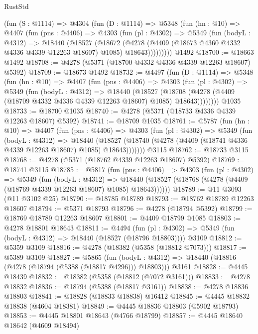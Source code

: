 \begin{lexlean}{RustStd}
\begin{coremodule}
    (fun (S : @1114) =>
    @4304
      (fun (D : @1114) =>
      @5348
        (fun (hn : @10) =>
        @4407
          (fun (pns : @4406) =>
          @4303
            (fun (pl : @4302) =>
            @5349
              (fun (bodyL : @4312) =>
              @18440
                (@18527
                  (@18672
                    (@4278
                      (@4409 (@18673 @4360 @4332 @4336 @4339 @12263 @18607) @1085)
                      @18643)))))))))
    @1492
@18700 := @18663 @1492
@18708 := @4278 (@5371 (@18700 @4332 @4336 @4339 @12263 @18607) @5392)
@18709 := @18673 @1492
@18732 := @4497
    (fun (D : @1114) =>
    @5348
      (fun (hn : @10) =>
      @4407
        (fun (pns : @4406) =>
        @4303
          (fun (pl : @4302) =>
          @5349
            (fun (bodyL : @4312) =>
            @18440
              (@18527
                (@18708 (@4278 (@4409 (@18709 @4332 @4336 @4339 @12263 @18607) @1085) @18643))))))))
    @1035
@18733 := @18700 @1035
@18740 := @4278 (@5371 (@18733 @4336 @4339 @12263 @18607) @5392)
@18741 := @18709 @1035
@18761 := @5787
    (fun (hn : @10) =>
    @4407
      (fun (pns : @4406) =>
      @4303
        (fun (pl : @4302) =>
        @5349
          (fun (bodyL : @4312) =>
          @18440
            (@18527 (@18740 (@4278 (@4409 (@18741 @4336 @4339 @12263 @18607) @1085) @18643)))))))
    @3115
@18762 := @18733 @3115
@18768 := @4278 (@5371 (@18762 @4339 @12263 @18607) @5392)
@18769 := @18741 @3115
@18785 := @5817
    (fun (pns : @4406) =>
    @4303
      (fun (pl : @4302) =>
      @5349
        (fun (bodyL : @4312) =>
        @18440 (@18527 (@18768 (@4278 (@4409 (@18769 @4339 @12263 @18607) @1085) @18643))))))
@18789 := @11 @3093 (@11 @3102 @25)
@18790 := @18785 @18789
@18793 := @18762 @18789 @12263 @18607
@18794 := @5371 @18793
@18796 := @4278 (@18794 @5392)
@18799 := @18769 @18789 @12263 @18607
@18801 := @4409 @18799 @1085
@18803 := @4278 @18801 @18643
@18811 := @4494
    (fun (pl : @4302) => @5349 (fun (bodyL : @4312) => @18440 (@18527 (@18796 @18803))))
    @3109
@18812 := @5359 @3109
@18816 := @4278 (@18382 (@5358 (@18812 @7073)))
@18817 := @5389 @3109
@18827 := @5865
    (fun (bodyL : @4312) => @18440 (@18816 (@4278 (@18794 (@5388 (@18817 @4296))) @18803)))
    @3161
@18828 := @4445 @18439
@18832 := @18382 (@5358 (@18812 (@7072 @3161)))
@18833 := @4278 @18832
@18836 := @18794 (@5388 (@18817 @3161))
@18838 := @4278 @18836 @18803
@18841 := @18828 (@18833 @18838) @16412
@18845 := @4445 @18832 @18838 (@4604 @18381)
@18849 := @4445 @18836 @18803 (@5902 @18793)
@18853 := @4445 @18801 @18643 (@4766 @18799)
@18857 := @4445 @18640 @18642 (@4609 @18494)

\end{coremodule}
\end{lexlean}
